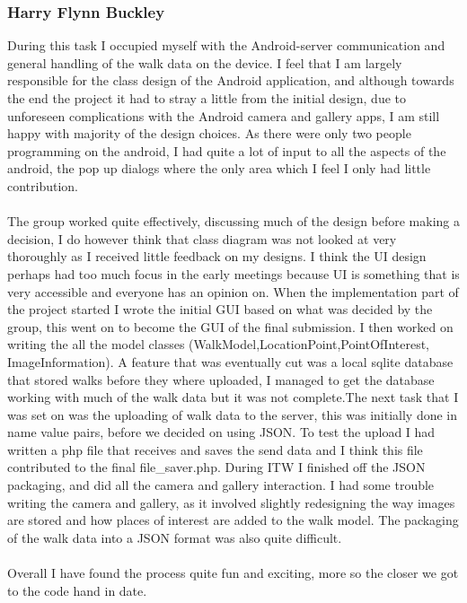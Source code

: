 \documentclass[12pt]{article}
\begin{document}
\subsubsection{Harry Flynn Buckley}
During this task I occupied myself with the Android-server communication and general handling of the walk data on the device. I feel that I am largely responsible for the class design of the Android application, and although towards the end the project it had to stray a little from the initial design, due to unforeseen complications with the Android camera and gallery apps, I am still happy with majority of the design choices. As there were only two people programming on the android, I had quite a lot of input to all the aspects of the android, the pop up dialogs where the only area which I feel I only had little contribution. 
~\\\\
The group worked quite effectively, discussing much of the design before making a decision, I do however think that class diagram was not looked at very thoroughly as I received little feedback on my designs. I think the UI design perhaps had too much focus in the early meetings because UI is something that is very accessible and everyone has an opinion on. When the implementation part of the project started I wrote the initial GUI based on what was decided by the group, this went on to become the GUI of the final submission. I then worked on writing the all the model classes (WalkModel,LocationPoint,PointOfInterest, ImageInformation). A feature that was eventually cut was a local sqlite database that stored walks before they where uploaded, I managed to get the database working with much of the walk data but it was not complete.The next task that I was set on was the uploading of walk data to the server, this was initially done in name value pairs, before we decided on using JSON. To test the upload I had written a php file that receives and saves the send data and I think this file contributed to the final file\_saver.php. During ITW I finished off the JSON packaging, and did  all the camera and gallery interaction. I had some trouble writing the camera and gallery, as it involved slightly redesigning the way images are stored and how places of interest are added to the walk model. The packaging of the walk data into a JSON format was also quite difficult.
~\\\\
Overall I have found the process quite fun and exciting, more so the closer we got to the code hand in date.
\end{document}
